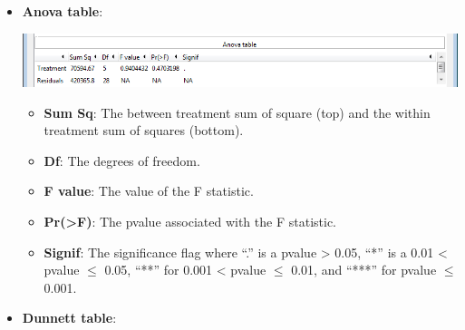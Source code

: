 \documentclass[a4paper]{article}
\begin{document}
\begin{enumerate}
\begin{itemize}
	
			
			\item \textbf{Anova table}:

				\hypertarget{fig:Anova}{}	
				\begin{center}
				\includegraphics[width=\textwidth,keepaspectratio]{Anova.png}
				\end{center} 
				
				\begin{itemize}
					\item \textbf{Sum Sq}: The between treatment sum of square (top) and the within 
						treatment sum of squares (bottom). 
					\item \textbf{Df}: The degrees of freedom.
					\item \textbf{F value}: The value of the F statistic.
					\item \textbf{Pr(>F)}: The p\textendash{}value associated with the F statistic.
					\item \textbf{Signif}: The significance flag where ``.'' is a p\textendash{}value > 0.05, ``*'' is
						a 0.01 < p\textendash{}value $\leq$  0.05, ``**'' for 0.001 < p\textendash{}value $\leq$  0.01, and ``***'' for p\textendash{}value $\leq$  0.001.
				\end{itemize}	
	
				
		
	
			\item \textbf{Dunnett table}:
			

\end{itemize}
\end{enumerate}
\end{document}
